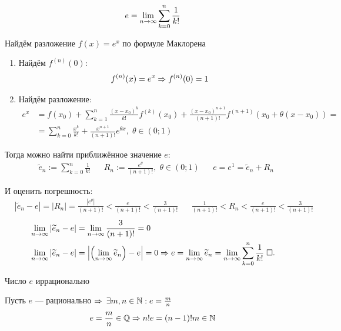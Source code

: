 \documentclass{article}
\begin{document}

\theorem
\begin{align*}
	e=\lim\limits_{n\to\infty}\sum_{k=0}^{n}\frac{1}{k!}
\end{align*}

\proof

Найдём разложение $f(x)=e^{x}$ по формуле Маклорена

\begin{enumerate}
	\item{}Найдём $f^{(n)}(0)$:
	\begin{align*}
		f^{(n)}(x)=e^{x}\Rightarrow f^{(n)}(0)=1
	\end{align*}
	\item{}Найдём разложение:
	\begin{align*}
		e^{x} & =f(x_0)+\sum_{k=1}^{n}\frac{(x-x_0)^{k}}{k!}f^{(k)}(x_0)+\frac{(x-x_0)^{n+1}}{(n+1)!}f^{(n+1)}(x_0+\theta(x-x_0))= \\
		      & =\sum_{k=0}^{n}\frac{x^{k}}{k!}+\frac{x^{n+1}}{(n+1)!}e^{\theta x},\;\theta\in(0;1)
	\end{align*}
\end{enumerate}

\newcommand\ep{\widetilde{e}}

Тогда можно найти приближённое значение $e$:
\begin{align}
	 & \ep_{n}:=\sum_{k=0}^{n}\frac{1}{k!} &  & R_{n}:=\frac{e^{\theta}}{(n+1)!},\;\theta\in(0;1) &  & e=e^{1}=\ep_{n}+R_{n}\label{68:taylor_e}
\end{align}

И оценить погрешность:
\begin{align}
	 & |\ep_{n}-e|=|R_{n}|=\frac{|e^{\theta}|}{(n+1)!}<\frac{e}{(n+1)!}<\frac{3}{(n+1)!} &  & \frac{1}{(n+1)!}<R_{n}<\frac{e}{(n+1)!}<\frac{3}{(n+1)!}\label{68:rlims}
\end{align}
\begin{align*}
	 & \slimty|\ep_{n}-e|=\slimty\frac{3}{(n+1)!}=0                                                                                \\
	 & \slimty|\ep_{n}-e|=\left|\left(\slimty\ep_{n}\right)-e\right|=0\Rarr e=\slimty\ep_{n}=\slimty\sum_{k=0}^{n}\frac{1}{k!}\qed
\end{align*}

\pagebreak

\theorem

Число $e$ иррационально

\proof

Пусть $e$ --- рационально $\Rightarrow$ $\exists m,n\in\mathbb{N}:e=\frac{m}{n}$
\begin{align*}
	e=\frac{m}{n}\in\mathbb{Q}\Rightarrow n!e=(n-1)!m\in\mathbb{N}
\end{align*}
\end{document}
